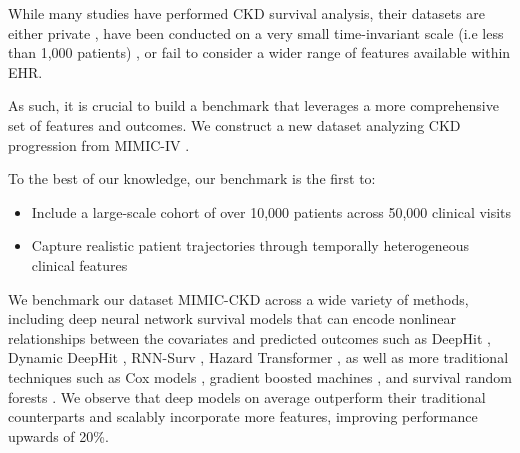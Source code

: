  While many studies have performed CKD survival analysis, their datasets are either private \citep{fatin2023renal_saudi_analysis_example1_of_private_data}, have been conducted on a very small time-invariant scale (i.e less than 1,000 patients) \citep{swain2023robust_classifier_imputation_CKD}, or fail to consider a wider range of features available within EHR.

As such, it is crucial to build a benchmark that leverages a more comprehensive set of features and outcomes. We construct a new dataset analyzing CKD progression from MIMIC-IV \citep{johnson2023mimic_ehr}. 

To the best of our knowledge, our benchmark is the first to:

\begin{itemize}
    \item Include a large-scale cohort of over 10,000 patients across 50,000 clinical visits
    \item Capture realistic patient trajectories through temporally heterogeneous clinical features
\end{itemize}

We benchmark our dataset MIMIC-CKD across a wide variety of methods, including deep neural network survival models that can encode nonlinear relationships between the covariates and predicted outcomes such as DeepHit \citep{lee2018deephit}, Dynamic DeepHit \citep{lee2019dynamic_deephit}, RNN-Surv \citep{giunchiglia2018rnn_surv}, Hazard Transformer \citep{hazard_transformer}, as well as more traditional techniques such as Cox models \citep{cox1972regression}, gradient boosted machines \citep{chen2013gradient_GBSA}, and survival random forests \citep{pickett2021random_survival_forests}. We observe that deep models on average outperform their traditional counterparts and scalably incorporate more features, improving performance upwards of 20\%. 





